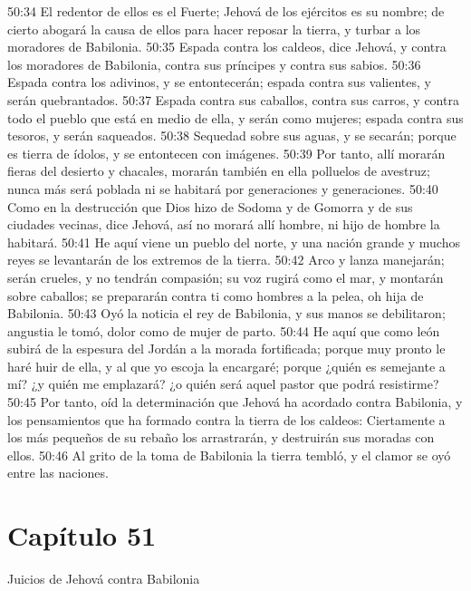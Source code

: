 50:34 El redentor de ellos es el Fuerte; Jehová de los ejércitos es su nombre; de cierto abogará la causa de ellos para hacer reposar la tierra, y turbar a los moradores de Babilonia. 
50:35 Espada contra los caldeos, dice Jehová, y contra los moradores de Babilonia, contra sus príncipes y contra sus sabios. 
50:36 Espada contra los adivinos, y se entontecerán; espada contra sus valientes, y serán quebrantados. 
50:37 Espada contra sus caballos, contra sus carros, y contra todo el pueblo que está en medio de ella, y serán como mujeres; espada contra sus tesoros, y serán saqueados. 
50:38 Sequedad sobre sus aguas, y se secarán; porque es tierra de ídolos, y se entontecen con imágenes. 
50:39 Por tanto, allí morarán fieras del desierto y chacales,  morarán también en ella polluelos de avestruz; nunca más será poblada ni se habitará por generaciones y generaciones. 
50:40 Como en la destrucción que Dios hizo de Sodoma y de Gomorra y de sus ciudades vecinas, dice Jehová, así no morará allí hombre, ni hijo de hombre la habitará. 
50:41 He aquí viene un pueblo del norte, y una nación grande y muchos reyes se levantarán de los extremos de la tierra. 
50:42 Arco y lanza manejarán; serán crueles, y no tendrán compasión; su voz rugirá como el mar, y montarán sobre caballos; se prepararán contra ti como hombres a la pelea, oh hija de Babilonia. 
50:43 Oyó la noticia el rey de Babilonia, y sus manos se debilitaron; angustia le tomó, dolor como de mujer de parto. 
50:44 He aquí que como león subirá de la espesura del Jordán a la morada fortificada; porque muy pronto le haré huir de ella, y al que yo escoja la encargaré; porque ¿quién es semejante a mí? ¿y quién me emplazará? ¿o quién será aquel pastor que podrá resistirme? 
50:45 Por tanto, oíd la determinación que Jehová ha acordado contra Babilonia, y los pensamientos que ha formado contra la tierra de los caldeos: Ciertamente a los más pequeños de su rebaño los arrastrarán, y destruirán sus moradas con ellos. 
50:46 Al grito de la toma de Babilonia la tierra tembló, y el clamor se oyó entre las naciones. 
\section*{Capítulo 51 }
Juicios de Jehová contra Babilonia 
 

